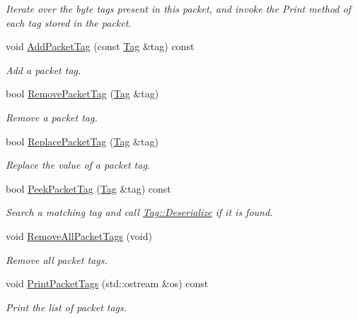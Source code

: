 \begin{DoxyCompactItemize}
\begin{DoxyCompactList}\small\item\em Iterate over the byte tags present in this packet, and invoke the Print method of each tag stored in the packet. \end{DoxyCompactList}\item 
void \hyperlink{classns3_1_1Packet_a7400b8655852f5271c5957250d0141af}{Add\+Packet\+Tag} (const \hyperlink{classns3_1_1Tag}{Tag} \&tag) const 
\begin{DoxyCompactList}\small\item\em Add a packet tag. \end{DoxyCompactList}\item 
bool \hyperlink{classns3_1_1Packet_a078fe922d976a417ab25ba2f3c2fd667}{Remove\+Packet\+Tag} (\hyperlink{classns3_1_1Tag}{Tag} \&tag)
\begin{DoxyCompactList}\small\item\em Remove a packet tag. \end{DoxyCompactList}\item 
bool \hyperlink{classns3_1_1Packet_afb014ae9f4adddbfc51c64b085bfd405}{Replace\+Packet\+Tag} (\hyperlink{classns3_1_1Tag}{Tag} \&tag)
\begin{DoxyCompactList}\small\item\em Replace the value of a packet tag. \end{DoxyCompactList}\item 
bool \hyperlink{classns3_1_1Packet_a1734de11f2ca1e78a7872461a0625168}{Peek\+Packet\+Tag} (\hyperlink{classns3_1_1Tag}{Tag} \&tag) const 
\begin{DoxyCompactList}\small\item\em Search a matching tag and call \hyperlink{classns3_1_1Tag_ae166b7f816bcbdef44dbeb636c9fa712}{Tag\+::\+Deserialize} if it is found. \end{DoxyCompactList}\item 
void \hyperlink{classns3_1_1Packet_a6c7bc5d1067c1d7fbd0fd70289182e8b}{Remove\+All\+Packet\+Tags} (void)
\begin{DoxyCompactList}\small\item\em Remove all packet tags. \end{DoxyCompactList}\item 
void \hyperlink{classns3_1_1Packet_a260fecda6a32bfc24e16a950e7d91559}{Print\+Packet\+Tags} (std\+::ostream \&os) const 
\begin{DoxyCompactList}\small\item\em Print the list of packet tags. \end{DoxyCompactList}\item 

\end{DoxyCompactItemize}
